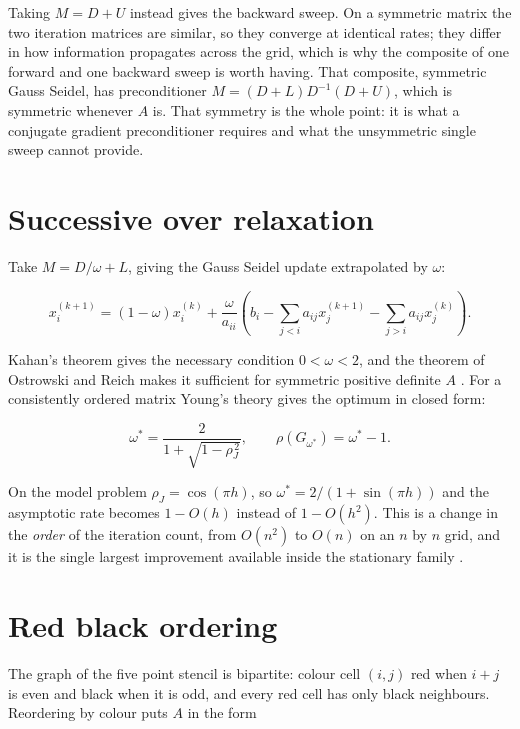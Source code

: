 Taking $M = D + U$ instead gives the backward sweep. On a symmetric matrix the
two iteration matrices are similar, so they converge at identical rates; they
differ in how information propagates across the grid, which is why the composite
of one forward and one backward sweep is worth having. That composite,
symmetric Gauss Seidel, has preconditioner
$M = (D+L)D^{-1}(D+U)$, which is symmetric whenever $A$ is. That symmetry is the
whole point: it is what a conjugate gradient preconditioner requires and what
the unsymmetric single sweep cannot provide.

\section{Successive over relaxation}

Take $M = D/\omega + L$, giving the Gauss Seidel update extrapolated by $\omega$:

\begin{equation}
  x_i^{(k+1)} = (1-\omega) x_i^{(k)}
    + \frac{\omega}{a_{ii}}\left(b_i
      - \sum_{j<i} a_{ij} x_j^{(k+1)}
      - \sum_{j>i} a_{ij} x_j^{(k)}\right).
\end{equation}

Kahan's theorem gives the necessary condition $0 < \omega < 2$, and the theorem
of Ostrowski and Reich makes it sufficient for symmetric positive definite $A$
\cite[Sec.~4.2]{saad2003}. For a consistently ordered matrix Young's theory
gives the optimum in closed form:

\begin{equation}
  \omega^{*} = \frac{2}{1 + \sqrt{1 - \rho_J^{\,2}}},
  \qquad
  \rho(G_{\omega^{*}}) = \omega^{*} - 1 .
  \label{eq:omega-opt}
\end{equation}

On the model problem $\rho_J = \cos(\pi h)$, so
$\omega^{*} = 2/(1 + \sin(\pi h))$ and the asymptotic rate becomes
$1 - O(h)$ instead of $1 - O(h^2)$. This is a change in the \emph{order} of the
iteration count, from $O(n^2)$ to $O(n)$ on an $n$ by $n$ grid, and it is the
single largest improvement available inside the stationary family
\cite[Ch.~4 to 6]{young1971}.

\section{Red black ordering}

The graph of the five point stencil is bipartite: colour cell $(i,j)$ red when
$i+j$ is even and black when it is odd, and every red cell has only black
neighbours. Reordering by colour puts $A$ in the form

